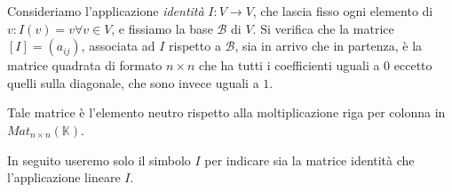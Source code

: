 \begin{observation}
	Consideriamo l'applicazione \emph{identit\`a} $I : V \rightarrow V$,
	che lascia fisso ogni elemento di $v: I(v) = v \forall v \in V$, e
	fissiamo la base $\mathcal{B}$ di $V$. Si verifica che la matrice
	$[I] = (a_{ij})$, associata ad $I$ rispetto a $\mathcal{B}$, sia in
	arrivo che in partenza, \`e la matrice quadrata di formato $n \times n$
	che ha tutti i coefficienti uguali a $0$ eccetto quelli sulla
	diagonale, che sono invece uguali a $1$.

	Tale matrice \`e l'elemento neutro rispetto alla moltiplicazione riga
	per colonna in $Mat_{n \times n}(\mathbb{K})$.

	In seguito useremo solo il simbolo $I$ per indicare sia la matrice identit\`a
	che	l'applicazione lineare $I$.
\end{observation}